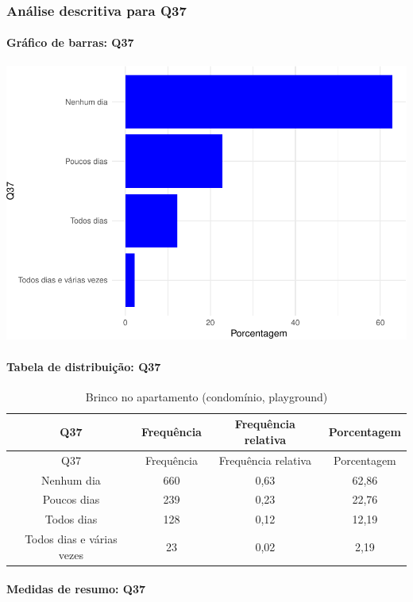 \documentclass[]{article}
\let\oldparagraph\paragraph
\renewcommand{\paragraph}[1]{\oldparagraph{#1}\mbox{}}
\begin{document}
\hypertarget{anuxe1lise-descritiva-para-q37}{%
\subsubsection{Análise descritiva para Q37}\label{anuxe1lise-descritiva-para-q37}}

\hypertarget{gruxe1fico-de-barras-q37}{%
\paragraph{Gráfico de barras: Q37}\label{gruxe1fico-de-barras-q37}}

\begin{center}\includegraphics[width=0.75\linewidth]{relatorio_covid19_files/figure-latex/unnamed-chunk-1366-1} \end{center}

\hypertarget{tabela-de-distribuiuxe7uxe3o-q37}{%
\paragraph{Tabela de distribuição: Q37}\label{tabela-de-distribuiuxe7uxe3o-q37}}

\begin{longtable}[]{@{}cccc@{}}
\caption{\label{tab:unnamed-chunk-1367}Brinco no apartamento (condomínio, playground)}\tabularnewline
\toprule
Q37 & Frequência & Frequência relativa & Porcentagem\tabularnewline
\midrule
\endfirsthead
\toprule
Q37 & Frequência & Frequência relativa & Porcentagem\tabularnewline
\midrule
\endhead
Nenhum dia & 660 & 0,63 & 62,86\tabularnewline
Poucos dias & 239 & 0,23 & 22,76\tabularnewline
Todos dias & 128 & 0,12 & 12,19\tabularnewline
Todos dias e várias vezes & 23 & 0,02 & 2,19\tabularnewline
\bottomrule
\end{longtable}

\hypertarget{medidas-de-resumo-q37}{%
\paragraph{Medidas de resumo: Q37}\label{medidas-de-resumo-q37}}
\end{document}

